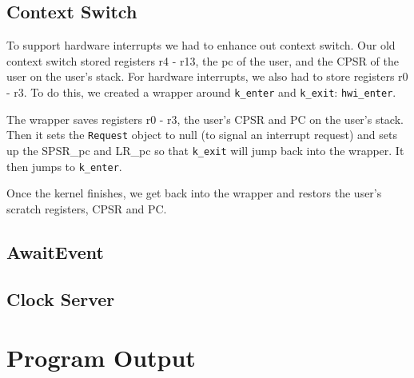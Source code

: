 \documentclass[letterpaper]{article}
\begin{document}
\subsection{Context Switch}

To support hardware interrupts we had to enhance out context switch. Our old context switch stored registers r4 - r13, the pc of the user, and the CPSR of the user on the user's stack. For hardware interrupts, we also had to store registers r0 - r3. To do this, we created a wrapper around {\tt k\_enter} and {\tt k\_exit}: {\tt hwi\_enter}.

The wrapper saves registers r0 - r3, the user's CPSR and PC on the user's stack. Then it sets the {\tt Request} object to null (to signal an interrupt request) and sets up the SPSR\_pc and LR\_pc so that {\tt k\_exit} will jump back into the wrapper. It then jumps to {\tt k\_enter}.

Once the kernel finishes, we get back into the wrapper and restors the user's scratch registers, CPSR and PC.

\subsection{AwaitEvent}

\subsection{Clock Server}

\section{Program Output}
\end{document}
